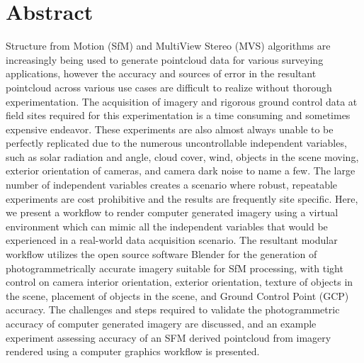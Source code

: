 \section*{Abstract}
Structure from Motion (SfM) and MultiView Stereo (MVS) algorithms are increasingly being used to generate pointcloud data for various surveying applications, however the accuracy and sources of error in the resultant pointcloud across various use cases are difficult to realize without thorough experimentation.  The acquisition of imagery and rigorous ground control data at field sites required for this experimentation is a time consuming and sometimes expensive endeavor.  These experiments are also almost always unable to be perfectly replicated due to the numerous uncontrollable independent variables, such as solar radiation and angle, cloud cover, wind, objects in the scene moving, exterior orientation of cameras, and camera dark noise to name a few.  The large number of independent variables creates a scenario where robust, repeatable experiments are cost prohibitive and the results are frequently site specific.  Here, we present a workflow to render computer generated imagery using a virtual environment which can mimic all the independent variables that would be experienced in a real-world data acquisition scenario.  The resultant modular workflow utilizes the open source software Blender for the generation of photogrammetrically accurate imagery suitable for SfM processing, with tight control on camera interior orientation, exterior orientation, texture of objects in the scene, placement of objects in the scene, and Ground Control Point (GCP) accuracy.  The challenges and steps required to validate the photogrammetric accuracy of computer generated imagery are discussed, and an example experiment assessing accuracy of an SFM derived pointcloud from imagery rendered using a computer graphics workflow is presented.